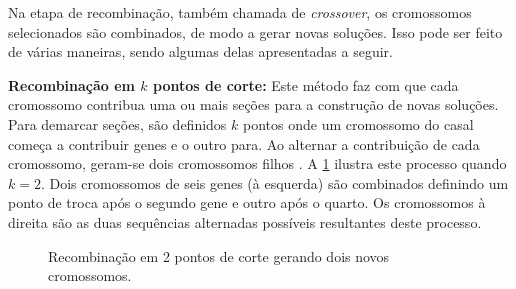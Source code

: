 Na etapa de recombinação, também chamada de \emph{crossover}, os cromossomos selecionados são combinados, de modo a gerar novas soluções. Isso pode ser feito de várias maneiras, sendo algumas delas apresentadas a seguir.

\textbf{Recombinação em $k$ pontos de corte:} Este método faz com que cada cromossomo contribua uma ou mais seções para a construção de novas soluções. Para demarcar seções, são definidos $k$ pontos onde um cromossomo do casal começa a contribuir genes e o outro para. Ao alternar a contribuição de cada cromossomo, geram-se dois cromossomos filhos \cite{OTERO2016}. A \cref{fig:recombinação 2 pontos} ilustra este processo quando $k = 2$. Dois cromossomos de seis genes (à esquerda) são combinados definindo um ponto de troca após o segundo gene e outro após o quarto. Os cromossomos à direita são as duas sequências alternadas possíveis resultantes deste processo.

\begin{figure}[ht]
    \centering
    \caption{Recombinação em 2 pontos de corte gerando dois novos cromossomos.}
    \label{fig:recombinação 2 pontos}
\end{figure}

